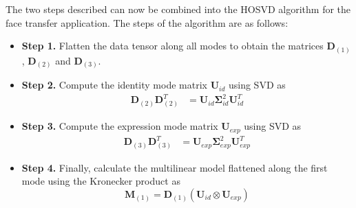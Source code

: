 \documentclass[11pt,a4paper]{report}
\begin{document}
The two steps described can now be combined into the HOSVD algorithm for the
face transfer application. The steps of the algorithm are as follows:
\begin{itemize}
\item \textbf{Step 1.} Flatten the data tensor along all modes to obtain the
  matrices $\mathbf{D}_{(1)}$, $\mathbf{D}_{(2)}$ and $\mathbf{D}_{(3)}$.
\item \textbf{Step 2.} Compute the identity mode matrix $\mathbf{U}_{id}$ using
  SVD as
\begin{align}\label{eq:hosvdsvdi}
\mathbf{D}_{(2)}\mathbf{D}_{(2)}^T &= \mathbf{U}_{id} \mathbf{\Sigma}_{id}^2 \mathbf{U}_{id}^T
\end{align}
\item \textbf{Step 3.} Compute the expression mode matrix $\mathbf{U}_{exp}$ using
  SVD as
\begin{align}\label{eq:hosvdsvde}
\mathbf{D}_{(3)}\mathbf{D}_{(3)}^T &= \mathbf{U}_{exp} \mathbf{\Sigma}_{exp}^2 \mathbf{U}_{exp}^T
\end{align}
\item \textbf{Step 4.} Finally, calculate the multilinear model flattened along
  the first mode using the Kronecker product as
\begin{equation}
\mathbf{M}_{(1)} = \mathbf{D}_{(1)} (\mathbf{U}_{id} \otimes \mathbf{U}_{exp})
\end{equation}
\end{itemize}
\end{document}
